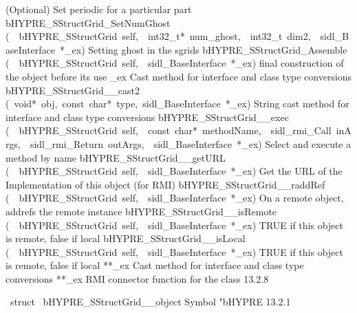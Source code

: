 \documentclass{article}
\begin{document}
\begin{cxxentry}
\begin{cxxentry}
\begin{cxxnames}
        {
(Optional) Set periodic for a particular part}
        {}
\label{cxx.13.2.16}
        {bHYPRE\_SStructGrid\_SetNumGhost}
        {(\ \ bHYPRE\_SStructGrid\ self,\ \ int32\_t*\ num\_ghost,\ \ int32\_t\ dim2,\ \ sidl\_BaseInterface\ *\_ex)}
        {
Setting ghost in the sgrids}
        {}
\label{cxx.13.2.17}
        {bHYPRE\_SStructGrid\_Assemble}
        {(\ \ bHYPRE\_SStructGrid\ self,\ \ sidl\_BaseInterface\ *\_ex)}
        {
final construction of the object before its use }
        {}
\label{cxx.13.2.18}
        {\_ex}
        {}
        {
Cast method for interface and class type conversions}
        {}
\label{cxx.13.2.19}
        {bHYPRE\_SStructGrid\_\_cast2}
        {(\ void*\ obj,\ const\ char*\ type,\ sidl\_BaseInterface\ *\_ex)}
        {
String cast method for interface and class type conversions}
        {}
\label{cxx.13.2.20}
        {bHYPRE\_SStructGrid\_\_exec}
        {(\ \ bHYPRE\_SStructGrid\ self,\ \ const\ char*\ methodName,\ \ sidl\_rmi\_Call\ inArgs,\ \ sidl\_rmi\_Return\ outArgs,\ \ sidl\_BaseInterface\ *\_ex)}
        {
Select and execute a method by name}
        {}
\label{cxx.13.2.21}
        {bHYPRE\_SStructGrid\_\_getURL}
        {(\ \ bHYPRE\_SStructGrid\ self,\ \ sidl\_BaseInterface\ *\_ex)}
        {
Get the URL of the Implementation of this object (for RMI)}
        {}
\label{cxx.13.2.22}
        {bHYPRE\_SStructGrid\_\_raddRef}
        {(\ \ bHYPRE\_SStructGrid\ self,\ \ sidl\_BaseInterface\ *\_ex)}
        {
On a remote object, addrefs the remote instance}
        {}
\label{cxx.13.2.23}
        {bHYPRE\_SStructGrid\_\_isRemote}
        {(\ \ bHYPRE\_SStructGrid\ self,\ \ sidl\_BaseInterface\ *\_ex)}
        {
TRUE if this object is remote, false if local}
        {}
\label{cxx.13.2.24}
        {bHYPRE\_SStructGrid\_\_isLocal}
        {(\ \ bHYPRE\_SStructGrid\ self,\ \ sidl\_BaseInterface\ *\_ex)}
        {
TRUE if this object is remote, false if local}
        {}
\label{cxx.13.2.25}
        {**\_ex}
        {}
        {
Cast method for interface and class type conversions}
        {}
\label{cxx.13.2.26}
        {**\_ex}
        {}
        {
RMI connector function for the class}
        {13.2.8}
\end{cxxnames}
\begin{cxxvariable}
{\ struct\ }
        {bHYPRE\_SStructGrid\_\_object}
        {}
        {
Symbol "bHYPRE}
        {13.2.1}
\begin{cxxdoc}


\end{cxxdoc}
\end{cxxvariable}
\end{cxxentry}
\end{cxxentry}
\end{document}
